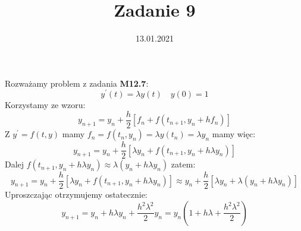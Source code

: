 \documentclass{article}
\title{Zadanie 9}
\date{13.01.2021}
\begin{document}
\maketitle
Rozważamy problem z zadania \textbf{M12.7}:
\begin{equation}
    y^\prime(t) = \lambda y(t) \quad y(0) = 1
\end{equation}
Korzystamy ze wzoru:
\begin{equation}
    y_{n+1} = y_n + \frac h 2 [f_n + f(t_{n+1}, y_n + hf_n)]
\end{equation}
Z $y^\prime = f(t,y)$ mamy $f_n = f(t_n,y_n) = \lambda y(t_n) = \lambda y_n$ mamy więc:
\begin{equation}
    y_{n+1} = y_n + \frac h 2 [\lambda y_n + f(t_{n+1}, y_n + h\lambda y_n)]
\end{equation}
Dalej $f(t_{n+1}, y_n + h\lambda y_n) \approx \lambda (y_n + h \lambda y_n)$ zatem:
\begin{equation}
    y_{n+1} = y_n + \frac h 2 [\lambda y_n + f(t_{n+1}, y_n + h\lambda y_n)] \approx y_n + \frac h 2 [\lambda y_n + \lambda (y_n + h \lambda y_n)]
\end{equation}
Uproszczając otrzymujemy ostatecznie:
\begin{equation}
    y_{n+1} = y_n + h\lambda y_n + \frac{h^2\lambda^2}{2} y_n = y_n\left(1 + h\lambda + \frac{h^2\lambda^2}{2} \right)
\end{equation}
\end{document}
